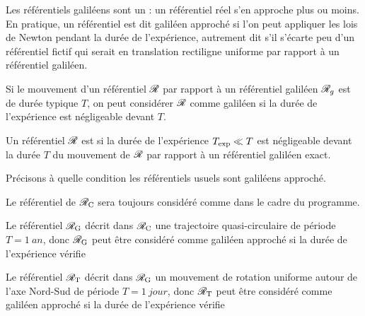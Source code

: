 \documentclass[12pt,fancy]{cours}
\begin{document}
Les référentiels galiléens sont un  : un référentiel réel s’en approche plus ou moins. En pratique, un référentiel est dit galiléen approché si l’on peut appliquer les lois de Newton pendant la durée de l'expérience, autrement dit s’il s’écarte peu d’un référentiel fictif qui serait en translation rectiligne uniforme par rapport à un référentiel galiléen.

Si le mouvement d’un référentiel $\mathcal{R}$ par rapport à un référentiel galiléen $\mathcal{R}_g$ est de durée typique $T$, on peut considérer $\mathcal{R}$ comme galiléen si la durée de l’expérience est négligeable devant $T$.

\begin{prop}\label{prop:}
Un référentiel $\mathcal{R}$ est  si la durée de l’expérience $T_{\rm exp} \ll T$ est négligeable devant la durée $T$ du mouvement de $\mathcal{R}$ par rapport à un référentiel galiléen exact.
\end{prop}


Précisons à quelle condition les référentiels usuels sont galiléens approché.
\begin{liste}
\item Le référentiel de  $\mathcal{R_{\rm{C}}}$ sera toujours considéré comme  dans le cadre du programme.


\item  Le référentiel  $\mathcal{R}_{\rm{G}}$ décrit dans $\mathcal{R}_{\rm{C}}$ une trajectoire quasi-circulaire de période $T = \SI{1}{an}$, donc $\mathcal{R}_{\rm{G}}$ peut être considéré comme galiléen approché si la durée de l’expérience vérifie



\item  Le référentiel  $\mathcal{R}_{\rm{T}}$ décrit dans $\mathcal{R}_{\rm{G}}$ un mouvement de rotation uniforme autour de l’axe Nord-Sud de période $T = \SI{1}{jour}$, donc $\mathcal{R}_{\rm{T}}$ peut être considéré comme galiléen approché si la durée de l’expérience vérifie


\end{liste}
\end{document}
